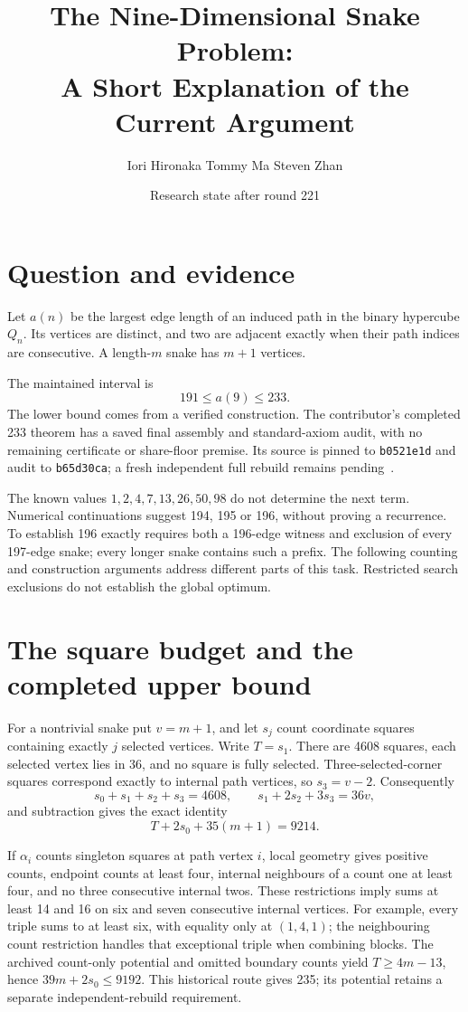\documentclass[11pt,a4paper]{article}
\title{The Nine-Dimensional Snake Problem:\\A Short Explanation of the Current Argument}
\author{Iori Hironaka \quad Tommy Ma \quad Steven Zhan}
\date{Research state after round 221}
\begin{document}
\maketitle

\section{Question and evidence}
Let $a(n)$ be the largest edge length of an induced path in the binary
hypercube $Q_n$. Its vertices are distinct, and two are adjacent exactly
when their path indices are consecutive. A length-$m$ snake has $m+1$ vertices.

The maintained interval is
\[
\boxed{191\le a(9)\le233.}
\]
The lower bound comes from a verified construction. The contributor's
completed 233 theorem has a saved final assembly and standard-axiom audit,
with no remaining certificate or share-floor premise. Its source is pinned
to \texttt{b0521e1d} and audit to \texttt{b65d30ca}; a fresh independent
full rebuild remains pending~\cite{bound233archive}.

The known values $1,2,4,7,13,26,50,98$ do not determine the next term.
Numerical continuations suggest 194, 195 or 196, without proving a recurrence.
To establish 196 exactly requires both a 196-edge witness and exclusion
of every 197-edge snake; every longer snake contains such a prefix.
The following counting and construction arguments address different parts
of this task. Restricted search exclusions do not establish the global optimum.

\section{The square budget and the completed upper bound}
For a nontrivial snake put $v=m+1$, and let $s_j$ count coordinate squares
containing exactly $j$ selected vertices. Write $T=s_1$.
There are 4608 squares, each selected vertex lies in 36, and no square
is fully selected. Three-selected-corner squares correspond exactly to
internal path vertices, so $s_3=v-2$. Consequently
\[
s_0+s_1+s_2+s_3=4608,\qquad s_1+2s_2+3s_3=36v,
\]
and subtraction gives the exact identity
\[
\boxed{T+2s_0+35(m+1)=9214.}
\]

If $\alpha_i$ counts singleton squares at path vertex $i$, local geometry
gives positive counts, endpoint counts at least four, internal neighbours
of a count one at least four, and no three consecutive internal twos.
These restrictions imply sums at least 14 and 16 on six and seven
consecutive internal vertices. For example, every triple sums to at least
six, with equality only at $(1,4,1)$; the neighbouring count restriction
handles that exceptional triple when combining blocks.
The archived count-only potential and omitted boundary counts yield
$T\ge4m-13$, hence $39m+2s_0\le9192$. This historical route gives 235;
its potential retains a separate independent-rebuild requirement.
\end{document}

